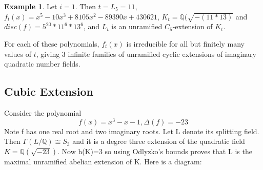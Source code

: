 \documentclass[12pt]{extarticle}
\newcommand{\Q}{\mathbb{Q}}
\newcommand{\<}{\langle}
\renewcommand{\>}{\rangle}
\theoremstyle{definition}
\newtheorem*{example}{Example}
\begin{document}
\begin{example}
Let $i=1$. Then $t=L_{5} = 11$, $f_t(x) = x^5 - 10x^3 + 8105x^2 - 89390x + 430621$, $K_t = \Q(\sqrt{-( 11*13)}$ and $disc(f) =5^{20} * 11^6 * 13^6
$,  and $L_t$ is an unramified $C_5$-extension of $K_t$. 
\end{example}
For each of these polynomials, $f_t(x)$ is irreducible for all but finitely many values of $t$, giving 3 infinite families of unramified cyclic extensions of imaginary quadratic number fields. 

\subsection{Cubic Extension}
Consider the polynomial \begin{equation}
 f(x)=x^3-x-1, \Delta(f)=-23
\end{equation}
Note f has one real root and two imaginary roots. Let L denote its splitting field. Then $\Gamma(L/\mathbb{Q})\cong S_3$ and it is a degree three extension of the quadratic field $K= \mathbb{Q}(\sqrt{-23})$. Now h(K)=3 so using Odlyzko's bounds proves that L is the maximal unramified abelian extension of K. Here is a diagram:
\begin{center}
\end{center}
\end{document}
